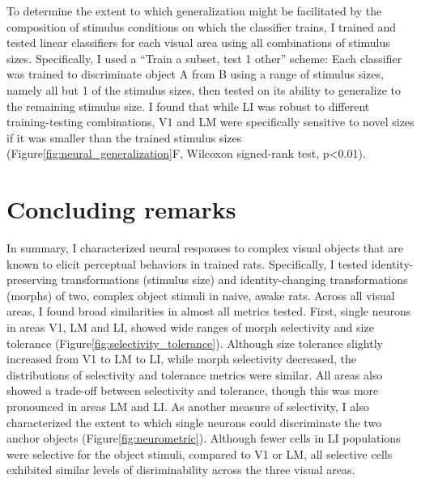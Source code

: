 To determine the extent to which generalization might be facilitated by the composition of stimulus conditions on which the classifier trains, I trained and tested linear classifiers for each visual area using all combinations of stimulus sizes. Specifically, I used a ``Train a subset, test 1 other'' scheme:  Each classifier was trained to discriminate object A from B using a range of stimulus sizes, namely all but 1 of the stimulus sizes, then tested on its ability to generalize to the remaining stimulus size. I found that while LI was robust to different training-testing combinations, V1 and LM were specifically sensitive to novel sizes if it was smaller than the trained stimulus sizes (Figure\ref{fig:neural_generalization}F, Wilcoxon signed-rank test, p<0.01). 


\section{Concluding remarks}
In summary, I characterized neural responses to complex visual objects that are known to elicit perceptual behaviors in trained rats. Specifically, I tested identity-preserving transformations (stimulus size) and identity-changing transformations (morphs) of two, complex object stimuli in naive, awake rats. Across all visual areas, I found broad similarities in almost all metrics tested. First, single neurons in areas V1, LM and LI, showed wide ranges of morph selectivity and size tolerance (Figure\ref{fig:selectivity_tolerance}). Although size tolerance slightly increased from V1 to LM to LI, while morph selectivity decreased, the distributions of selectivity and tolerance metrics were similar. All areas also showed a trade-off between selectivity and tolerance, though this was more pronounced in areas LM and LI. As another measure of selectivity, I also characterized the extent to which single neurons could discriminate the two anchor objects (Figure\ref{fig:neurometric}). Although fewer cells in LI populations were selective for the object stimuli, compared to V1 or LM, all selective cells exhibited similar levels of disriminability across the three visual areas. 

